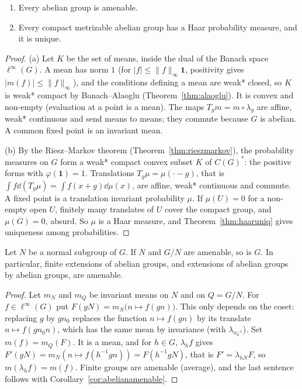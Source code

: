 \begin{corollary}\label{cor:abelianamenable}
\begin{enumerate}
\item[(a)] Every abelian group is amenable.
\item[(b)] Every compact metrizable abelian group has a Haar probability measure, and it is unique.
\end{enumerate}
\end{corollary}
\begin{proof}
(a) Let $K$ be the set of means, inside the dual of the Banach space $\ell^\infty(G)$. A mean has norm $1$ (for $|f|\le\|f\|_\infty\mathbf 1$, positivity gives
$|m(f)|\le\|f\|_\infty$), and the conditions defining a mean are weak* closed, so $K$ is weak* compact by Banach--Alaoglu (Theorem~\ref{thm:alaoglu}). It is convex and
non-empty (evaluation at a point is a mean). The maps $T_gm=m\circ\lambda_g$ are affine, weak* continuous and send means to means; they commute because $G$ is
abelian. A common fixed point is an invariant mean.

(b) By the Riesz--Markov theorem (Theorem~\ref{thm:rieszmarkov}), the probability measures on $G$ form a weak* compact convex subset $K$ of $C(G)^*$: the positive
forms with $\varphi(\mathbf 1)=1$. Translations $T_g\mu=\mu(\cdot-g)$, that is $\int f\dd(T_g\mu)=\int f(x+g)\dd\mu(x)$, are affine, weak* continuous and commute. A fixed point is a
translation invariant probability $\mu$. If $\mu(U)=0$ for a non-empty open $U$, finitely many translates of $U$ cover the compact group, and $\mu(G)=0$, absurd.
So $\mu$ is a Haar measure, and Theorem~\ref{thm:haaruniq} gives uniqueness among probabilities.
\end{proof}

\begin{proposition}\label{prop:amenableext}
Let $N$ be a normal subgroup of $G$. If $N$ and $G/N$ are amenable, so is $G$. In particular, finite extensions of abelian groups, and extensions of abelian
groups by abelian groups, are amenable.
\end{proposition}
\begin{proof}
Let $m_N$ and $m_Q$ be invariant means on $N$ and on $Q=G/N$. For $f\in\ell^\infty(G)$ put $F(gN)=m_N\bigl(n\mapsto f(gn)\bigr)$. This only depends on the coset: replacing $g$ by
$gn_0$ replaces the function $n\mapsto f(gn)$ by its translate $n\mapsto f(gn_0n)$, which has the same mean by invariance (with $\lambda_{n_0^{-1}}$). Set $m(f)=m_Q(F)$. It is a
mean, and for $h\in G$, $\lambda_hf$ gives $F'(gN)=m_N(n\mapsto f(h^{-1}gn))=F(h^{-1}gN)$, that is $F'=\lambda_{hN}F$, so $m(\lambda_hf)=m(f)$. Finite groups are amenable
(average), and the last sentence follows with Corollary~\ref{cor:abelianamenable}.
\end{proof}

